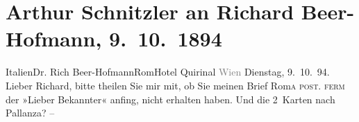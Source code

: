 

         
         \newcommand{\erwaehntePersonen}{Personen: Hermann Bahr, Richard Beer-Hofmann, Emil Heilbut}
         \newcommand{\erwaehnteInstitutionen}{Institutionen: Die Zeit. Wiener Wochenschrift}
         \newcommand{\erwaehnteOrte}{Orte: Hotel Quirinale, IX., Alsergrund, Italien, Lammgasse, Pallanza, Rom, Wien}
         \newcommand{\erwaehnteWerke}{Werke: Burgtheater [Das fünfte Jahr], Die Schmetterlingsschlacht. Komödie in 4 Akten, Die Zeit. Wiener Wochenschrift, »Schöne Frauen«}
               \section[Arthur Schnitzler an Richard Beer-Hofmann, 9. 10. 1894]{ Arthur Schnitzler an Richard Beer-Hofmann, 9. 10. 1894}\nopagebreak{}\rehead{ }\begin{ledgroupsized}[t]{13cm}\normalsize\beginnumbering \toendnotes[C]{\smallbreak\pagebreak[2]} 
\toendnotes[C]{\smallbreak}\pstart{}{\pb}Italien\pend{}\pstart{}Dr. Rich Beer-Hofmann\pend{}\pstart{}Rom\pend{}\pstart{}Hotel Quirinal\pend{}{\bigskip}\pstart
           \noindent{}{\pb}\textcolor{gray}{Wien}\pend
           \pstart
           \raggedleft{}Dienstag, 9. 10. 94.\pend
           \pstart
           Lieber Richard, bitte theilen Sie mir mit, ob Sie meinen Brief Rom\textsc{a post. ferm} der »Lieber Bekannter« anfing, nicht erhalten
               haben. Und die 2 Karten nach Pallanza? –\pend
           \pstart

\end{ledgroupsized}
